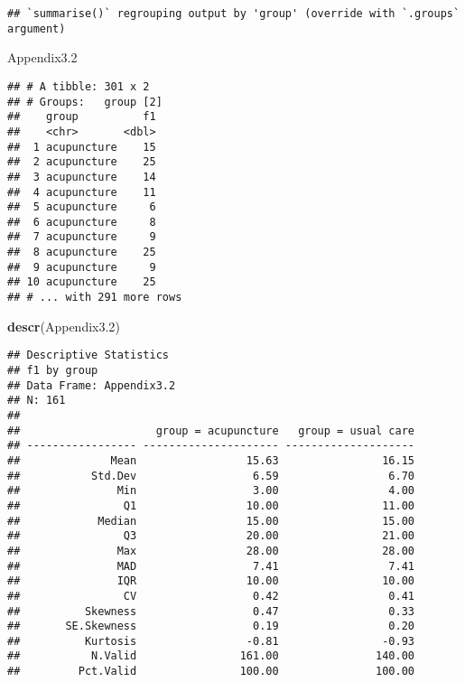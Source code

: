 \documentclass[
]{article}
\newenvironment{Shaded}{\begin{snugshade}}{\end{snugshade}}
\newcommand{\FloatTok}[1]{\textcolor[rgb]{0.00,0.00,0.81}{#1}}
\newcommand{\KeywordTok}[1]{\textcolor[rgb]{0.13,0.29,0.53}{\textbf{#1}}}
\newcommand{\NormalTok}[1]{#1}
\newcommand{\OperatorTok}[1]{\textcolor[rgb]{0.81,0.36,0.00}{\textbf{#1}}}
\newcommand{\StringTok}[1]{\textcolor[rgb]{0.31,0.60,0.02}{#1}}
\begin{document}
\begin{Shaded}
\end{Shaded}

\begin{verbatim}
## `summarise()` regrouping output by 'group' (override with `.groups` argument)
\end{verbatim}

\begin{Shaded}
\begin{Highlighting}[]
\NormalTok{Appendix3}\FloatTok{.2}
\end{Highlighting}
\end{Shaded}

\begin{verbatim}
## # A tibble: 301 x 2
## # Groups:   group [2]
##    group          f1
##    <chr>       <dbl>
##  1 acupuncture    15
##  2 acupuncture    25
##  3 acupuncture    14
##  4 acupuncture    11
##  5 acupuncture     6
##  6 acupuncture     8
##  7 acupuncture     9
##  8 acupuncture    25
##  9 acupuncture     9
## 10 acupuncture    25
## # ... with 291 more rows
\end{verbatim}

\begin{Shaded}
\begin{Highlighting}[]
\KeywordTok{descr}\NormalTok{(Appendix3}\FloatTok{.2}\NormalTok{)}
\end{Highlighting}
\end{Shaded}

\begin{verbatim}
## Descriptive Statistics  
## f1 by group  
## Data Frame: Appendix3.2  
## N: 161  
## 
##                     group = acupuncture   group = usual care
## ----------------- --------------------- --------------------
##              Mean                 15.63                16.15
##           Std.Dev                  6.59                 6.70
##               Min                  3.00                 4.00
##                Q1                 10.00                11.00
##            Median                 15.00                15.00
##                Q3                 20.00                21.00
##               Max                 28.00                28.00
##               MAD                  7.41                 7.41
##               IQR                 10.00                10.00
##                CV                  0.42                 0.41
##          Skewness                  0.47                 0.33
##       SE.Skewness                  0.19                 0.20
##          Kurtosis                 -0.81                -0.93
##           N.Valid                161.00               140.00
##         Pct.Valid                100.00               100.00
\end{verbatim}
\end{document}
